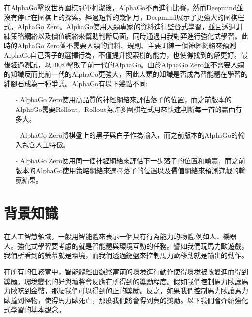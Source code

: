 \documentclass[a4paper,12pt]{article}
\begin{document}
\quad 在AlphaGo擊敗世界圍棋冠軍柯潔後，AlphaGo不再進行比賽，然而Deepmind並沒有停止在圍棋上的探索。經過短暫的幾個月，Deepmind展示了更強大的圍棋程式，AlphaGo Zero。AlphaGo使用人類專家的資料進行監督式學習，並且透過訓練策略網絡以及價值網絡來幫助判斷局面，同時通過自我對弈進行強化式學習。此時的AlphaGo Zero並不需要人類的資料、規則。主要訓練一個神經網絡來預測AlphaGo自己落子的選擇行為，不僅提升搜索樹的能力，也使得找到的解更好。最後經過測試，以100:0擊敗了前一代的AlphaGo。由於AlphaGo Zero並不需要人類的知識反而比前一代的AlphaGo更強大，因此人類的知識是否成為智能體在學習的絆腳石成為一種爭議。AlphaGo有以下幾點不同:
\begin{itemize}
\item[-] AlphaGo Zero使用高品質的神經網絡來評估落子的位置，而之前版本的AlphaGo需要Rollout，Rollout為許多圍棋程式用來快速判斷每一首的贏面有多大。
\item[-] AlphaGo Zero將棋盤上的黑子與白子作為輸入，而之前版本的AlphaGo的輸入包含人工特徵。
\item[-] AlphaGo Zero使用同一個神經網絡來評估下一步落子的位置和輸贏，而之前版本的AlphaGo使用策略網絡來選擇落子的位置以及價值網絡來預測遊戲的輸贏結果。
\end{itemize}
\section{背景知識}
\qquad 在人工智慧領域，一般用智能體來表示一個具有行為能力的物體,例如人、機器人。強化式學習要考慮的就是智能體與環境互動的任務。譬如我們玩馬力歐遊戲，我們所看到的螢幕就是環境，而我們透過鍵盤來控制馬力歐移動就是輸出的動作。

\quad 在所有的任務當中，智能體經由觀察當前的環境進行動作使得環境被改變進而得到獎勵。環境變化的好與壞將會反應在所得到的獎勵程度。假如我們控制馬力歐讓馬力歐吃到金幣，那麼我們可以得到的正的獎勵。反之，如果我們控制馬力歐讓馬力歐撞到怪物，使得馬力歐死亡，那麼我們將會得到負的獎勵。以下我們會介紹強化式學習的基本觀念。 \newline
\end{document}
